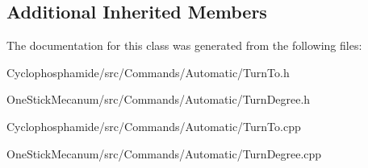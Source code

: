 \subsection*{Additional Inherited Members}


The documentation for this class was generated from the following files\+:\begin{DoxyCompactItemize}
\item 
Cyclophosphamide/src/\+Commands/\+Automatic/Turn\+To.\+h\item 
One\+Stick\+Mecanum/src/\+Commands/\+Automatic/Turn\+Degree.\+h\item 
Cyclophosphamide/src/\+Commands/\+Automatic/Turn\+To.\+cpp\item 
One\+Stick\+Mecanum/src/\+Commands/\+Automatic/Turn\+Degree.\+cpp\end{DoxyCompactItemize}
